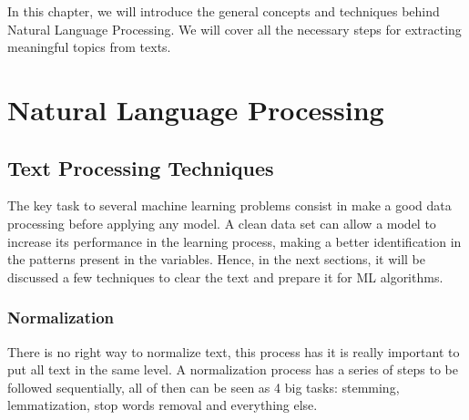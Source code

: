 In this chapter, we will introduce the general concepts and techniques behind Natural Language Processing. We will cover all the necessary steps for extracting meaningful topics from texts. %


\section{Natural Language Processing}

	

	\subsection{Text Processing Techniques}
	
	The key task to several machine learning problems consist in make a good data processing before applying any model. A clean data set can allow a model to increase its performance in the learning process, making a better identification in the patterns present in the variables. Hence, in the next sections, it will be discussed a few techniques to clear the text and prepare it for ML algorithms.
	
	\subsubsection{Normalization}
	
	There is no right way to normalize text, this process has it is really important to put all text in the same level. A normalization process has a series of steps to be followed sequentially, all of then can be seen as 4 big tasks: stemming, lemmatization, stop words removal and everything else.
	
